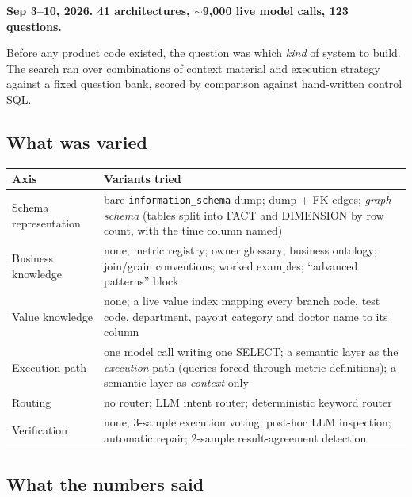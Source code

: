 \documentclass[11pt,a4paper]{report}
\newcommand{\code}[1]{\texttt{\small #1}}
\begin{document}
\textbf{Sep 3--10, 2026. 41 architectures, $\sim$9{,}000 live model calls, 123 questions.}

Before any product code existed, the question was which \emph{kind} of system to build. The search
ran over combinations of context material and execution strategy against a fixed question bank,
scored by comparison against hand-written control SQL.

\subsection{What was varied}

\begin{center}
\small
\begin{tabular}{@{}p{4.3cm}p{10.5cm}@{}}
\toprule
\textbf{Axis} & \textbf{Variants tried}\\
\midrule
Schema representation & bare \code{information\_schema} dump; dump + FK edges; \emph{graph schema}
 (tables split into FACT and DIMENSION by row count, with the time column named)\\
Business knowledge & none; metric registry; owner glossary; business ontology; join/grain
 conventions; worked examples; ``advanced patterns'' block\\
Value knowledge & none; a live value index mapping every branch code, test code, department,
 payout category and doctor name to its column\\
Execution path & one model call writing one SELECT; a semantic layer as the \emph{execution}
 path (queries forced through metric definitions); a semantic layer as \emph{context} only\\
Routing & no router; LLM intent router; deterministic keyword router\\
Verification & none; 3-sample execution voting; post-hoc LLM inspection; automatic repair;
 2-sample result-agreement detection\\
\bottomrule
\end{tabular}
\end{center}

\subsection{What the numbers said}
\end{document}
